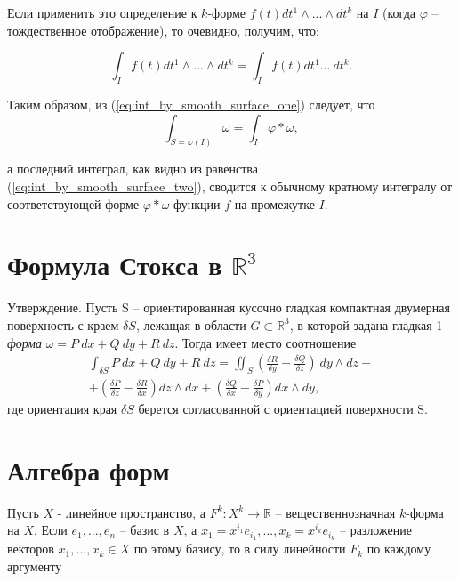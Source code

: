 \documentclass[a4paper, 12pt]{article} %
\begin{document}
Если применить это определение к $k$-форме $f(t) dt^1 \land ...\land dt^k$ на $I$ (когда $\varphi$ -- тождественное отображение), то очевидно, получим, что:

\begin{equation}
    \int_I f(t) dt^1 \land ... \land dt^k = \int_I f(t) dt^1 ... \ dt^k.
    \label{eq:int_by_smooth_surface_two}
\end{equation}

Таким образом, из (\ref{eq:int_by_smooth_surface_one}) следует, что
\begin{equation}
    \int_{S = \varphi(I)} \omega = \int_I \varphi * \omega,
\end{equation}

а последний интеграл, как видно из равенства (\ref{eq:int_by_smooth_surface_two}), сводится к обычному кратному интегралу от соответствующей форме $\varphi * \omega$ функции $f$ на промежутке $I$.

\clearpage
\section*{Формула Стокса в $\mathbb{R}^3$}
Утверждение. Пусть S -- ориентированная кусочно гладкая компактная двумерная поверхность с краем $\delta S$, лежащая в области $G \subset \mathbb{R}^3$, в которой задана гладкая 1-\textit{форма} $\omega = P\ dx + Q\ dy + R\ dz$. Тогда имеет место соотношение
\begin{eqnarray*}
    \int_{\delta S} P\ dx + Q\ dy + R\ dz = \iint_{S} \left( \frac{\delta R}{\delta y} - \frac{\delta Q}{\delta z} \right) \ dy \land dz + \\ + \left(\frac{\delta P}{\delta z} - \frac{\delta R}{\delta x}\right) dz \land dx + \left(\frac{\delta Q}{\delta x} - \frac{\delta P}{\delta y}\right) dx \land dy,
\end{eqnarray*}
где ориентация края $\delta S$ берется согласованной с ориентацией поверхности S.

\clearpage

\section*{Алгебра форм}
Пусть $X$ - линейное пространство, а $F^k : X^k \to \mathbb{R}$ -- вещественнозначная $k$-форма на $X$. Если $e_1, ..., e_n$ -- базис в $X$, а $x_1 = x^{i_1} e_{i_1}, ..., x_k = x^{i_k} e_{i_k}$ -- разложение векторов $x_1, ..., x_k \in X$ по этому базису, то в силу линейности $F_k$ по каждому аргументу
\end{document}
